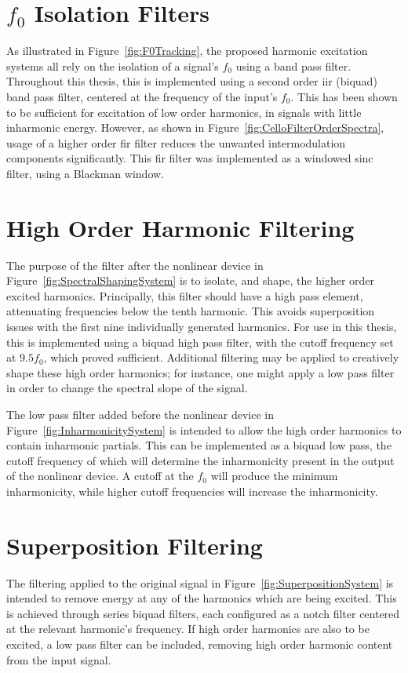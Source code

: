 \begin{appendices}
	\section{$f_{0}$ Isolation Filters}
		As illustrated in Figure~\ref{fig:F0Tracking}, the proposed harmonic excitation systems all rely on the
		isolation of a signal's $f_{0}$ using a band pass filter. Throughout this thesis, this is implemented using
		a second order \acrshort{iir} (biquad) band pass filter, centered at the frequency of the input's $f_{0}$.
		This has been shown to be sufficient for excitation of low order harmonics, in signals with little
		inharmonic energy.  However, as shown in Figure~\ref{fig:CelloFilterOrderSpectra}, usage of a higher order
		\acrshort{fir} filter reduces the unwanted intermodulation components significantly. This \acrshort{fir}
		filter was implemented as a windowed sinc filter, using a Blackman window.

	\section{High Order Harmonic Filtering}
		The purpose of the filter after the nonlinear device in Figure~\ref{fig:SpectralShapingSystem} is to
		isolate, and shape, the higher order excited harmonics. Principally, this filter should have a high pass
		element, attenuating frequencies below the tenth harmonic. This avoids superposition issues with the first
		nine individually generated harmonics. For use in this thesis, this is implemented using a biquad high pass
		filter, with the cutoff frequency set at $9.5f_{0}$, which proved sufficient. Additional filtering may be
		applied to creatively shape these high order harmonics; for instance, one might apply a low pass filter in
		order to change the spectral slope of the signal.

		The low pass filter added before the nonlinear device in Figure~\ref{fig:InharmonicitySystem} is intended to
		allow the high order harmonics to contain inharmonic partials. This can be implemented as a biquad low pass,
		the cutoff frequency of which will determine the inharmonicity present in the output of the nonlinear
		device. A cutoff at the $f_{0}$ will produce the minimum inharmonicity, while higher cutoff frequencies will
		increase the inharmonicity.

	\section{Superposition Filtering}
		The filtering applied to the original signal in Figure~\ref{fig:SuperpositionSystem} is intended to remove
		energy at any of the harmonics which are being excited. This is achieved through series biquad filters, each
		configured as a notch filter centered at the relevant harmonic's frequency. If high order harmonics are also
		to be excited, a low pass filter can be included, removing high order harmonic content from the input
		signal.

\end{appendices}
